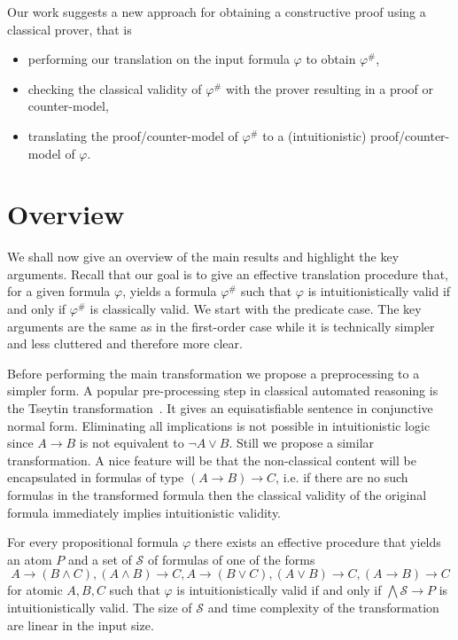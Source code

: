 \documentclass[a4paper,UKenglish,cleveref, autoref, thm-restate]{lipics-v2021}
\begin{document}
Our work suggests a new approach for obtaining a constructive proof using a classical prover, that is
\begin{itemize}
	\item performing our translation on the input formula $\varphi$ to obtain $\varphi^\#$,
	\item checking the classical validity of $\varphi^\#$ with the prover resulting in a proof or counter-model,
	\item translating the proof/counter-model of $\varphi^\#$ to a (intuitionistic) proof/counter-model of $\varphi$.
\end{itemize}



\section{Overview}

We shall now give an overview of the main results and highlight the key arguments. Recall that our goal is to give an effective translation procedure that, for a given formula $\varphi$, yields a formula $\varphi^\#$ such that $\varphi$ is intuitionistically valid if and only if $\varphi^\#$ is classically valid. We start with the predicate case. The key arguments are the same as in the first-order case while it is technically simpler and less cluttered and therefore more clear.

Before performing the main transformation we propose a preprocessing to a simpler form. A popular pre-processing step in classical automated reasoning is the Tseytin transformation~\cite{tseitin1983complexity}. It gives an equisatisfiable sentence in conjunctive normal form. Eliminating all implications is not possible in intuitionistic logic since $A\to B$ is not equivalent to $\neg A\vee B$. Still we propose a similar transformation. A nice feature will be that the non-classical content will be encapsulated in formulas of type $(A\to B)\to C$, i.e. if there are no such formulas in the transformed formula then the classical validity of the original formula immediately implies intuitionistic validity.

\begin{theorem}
	For every propositional formula $\varphi$ there exists an effective procedure that yields an atom $P$ and a set of $\mathcal S$ of formulas  of one of the forms
	$$A\to (B\wedge C), (A\wedge B)\to C, A\to (B\vee C), (A\vee B)\to C, (A\to B)\to C$$for atomic $A, B, C$ such that $\varphi$ is intuitionistically valid if and only if $\bigwedge\mathcal S\to P$ is intuitionistically valid. The size of $\mathcal S$ and time complexity of the transformation are linear in the input size.
\end{theorem}
\end{document}
